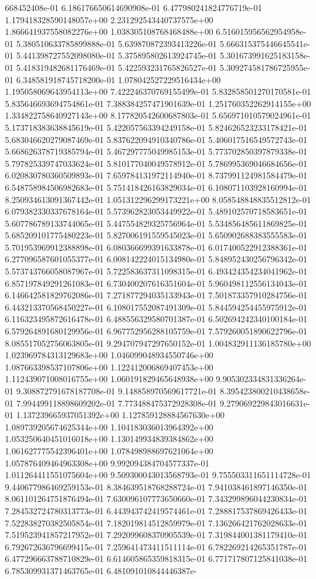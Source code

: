 668452408e-01	6.186176650614690908e-01	6.477980241824776719e-01	1.179418328590148057e+00	2.231292543440737575e+00	1.866641937558082276e+00	1.038305108768468488e+00	6.516015956562954958e-01	5.380510633785899888e-01	5.639870872393413226e-01	5.666315375446645541e-01	5.441398727552098080e-01	5.375895802613924745e-01	5.301673991625183158e-01	5.418319482681176469e-01	5.422593231765826527e-01	5.309274581786725955e-01	6.348581918745718200e-01	1.078042527229516434e+00	1.195058069643954113e+00	7.422246370769155499e-01	5.832858501270170581e-01	5.835646693694754861e-01	7.388384257471901639e-01	1.251760352262914155e+00	1.334822758640927143e+00	8.177820542600687803e-01	5.656971010579024961e-01	5.173718383638845619e-01	5.422057563394249158e-01	5.824626523233178421e-01	5.683046620279087469e-01	5.837622094910340786e-01	5.406017516549572743e-01	5.668626378719385794e-01	5.467297775049985153e-01	5.773702850397879338e-01	5.797825339747033624e-01	5.810177040049578912e-01	5.786995369046684656e-01	6.020830780360509893e-01	7.659784131972114940e-01	8.737991124981584479e-01	6.548758984506982683e-01	5.751418426163829034e-01	6.108071103928160994e-01	8.250934613091367442e-01	1.051312296299173221e+00	8.058548848835512812e-01	6.079382330337678164e-01	5.573962823053449922e-01	5.489102570718583651e-01	5.607786789133744065e-01	5.447554829325756964e-01	5.534856485611869825e-01	5.685209101775480223e-01	5.827006191559545023e-01	5.650902688383555583e-01	5.701953969912388898e-01	6.080366699391633878e-01	6.017400522912388361e-01	6.277096587601055377e-01	6.008142224015134980e-01	5.848952430256796342e-01	5.573743766058087967e-01	5.722583637311098315e-01	6.493424354234041962e-01	6.857197849291261083e-01	6.730400207616351604e-01	5.960498112556134043e-01	6.146642581829762086e-01	7.271877294035133943e-01	7.501873357910284756e-01	6.443213370568450227e-01	6.108017552087491309e-01	5.844594254455975912e-01	6.116323495872616478e-01	6.488556329580701387e-01	6.502694242340100184e-01	6.579264891680129956e-01	6.967752956288105759e-01	7.579260051890622796e-01	8.085517052756063805e-01	9.294707947297650152e-01	1.004832911136185780e+00	1.023969784313129683e+00	1.046099048934550746e+00	1.087663398537107806e+00	1.122412006869407453e+00	1.112439071008016755e+00	1.060191829465648938e+00	9.905302334831336264e-01	9.308872791678187708e-01	9.148858970569617721e-01	8.395423800210438658e-01	7.994499118898609202e-01	7.773488475372928308e-01	9.279069229843016631e-01	1.137239665937051392e+00	1.127859128884567630e+00	1.089739205674625344e+00	1.104183036013964392e+00	1.053250640451016018e+00	1.130149934839384862e+00	1.061627775542396401e+00	1.078498988697621064e+00	1.057876409464963308e+00	9.992094384704577337e-01	1.011264411551075604e+00	9.509300043013568793e-01	9.755503311651114728e-01	9.440677986469259153e-01	8.384639518768288724e-01	7.941038461897146350e-01	8.061101264751876494e-01	7.630096107773650660e-01	7.343299896044230834e-01	7.284532724780313773e-01	6.443943742419574461e-01	7.288817537869426433e-01	7.522838270382505854e-01	7.182019814512859979e-01	7.136266421762028633e-01	7.519523941857217952e-01	7.292099608370905539e-01	7.319844001381179410e-01	6.792672636796699415e-01	7.259641473411511114e-01	6.782269214265351787e-01	6.477296663788710829e-01	6.614605865359818315e-01	6.771717807125841038e-01	6.785309931371463765e-01	6.481091010844446387e-